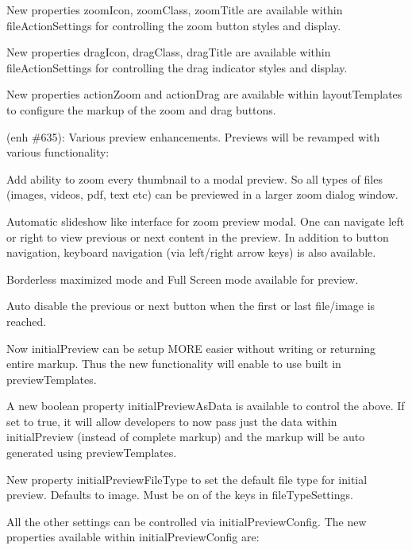 \begin{DoxyItemize}
\begin{DoxyItemize}
\item New properties {\ttfamily zoom\+Icon}, {\ttfamily zoom\+Class}, {\ttfamily zoom\+Title} are available within {\ttfamily file\+Action\+Settings} for controlling the zoom button styles and display.
\item New properties {\ttfamily drag\+Icon}, {\ttfamily drag\+Class}, {\ttfamily drag\+Title} are available within {\ttfamily file\+Action\+Settings} for controlling the drag indicator styles and display.
\item New properties {\ttfamily action\+Zoom} and {\ttfamily action\+Drag} are available within {\ttfamily layout\+Templates} to configure the markup of the zoom and drag buttons.
\end{DoxyItemize}
\item (enh \#635)\+: Various preview enhancements. Previews will be revamped with various functionality\+:
\begin{DoxyItemize}
\item Add ability to zoom every thumbnail to a modal preview. So all types of files (images, videos, pdf, text etc) can be previewed in a larger zoom dialog window.
\item Automatic slideshow like interface for zoom preview modal. One can navigate left or right to view previous or next content in the preview. In addition to button navigation, keyboard navigation (via left/right arrow keys) is also available.
\item Borderless maximized mode and Full Screen mode available for preview.
\item Auto disable the previous or next button when the first or last file/image is reached.
\item Now {\ttfamily initial\+Preview} can be setup M\+O\+RE easier without writing or returning entire markup. Thus the new functionality will enable to use built in {\ttfamily preview\+Templates}.
\item A new boolean property {\ttfamily initial\+Preview\+As\+Data} is available to control the above. If set to {\ttfamily true}, it will allow developers to now pass just the data within {\ttfamily initial\+Preview} (instead of complete markup) and the markup will be auto generated using {\ttfamily preview\+Templates}.
\item New property {\ttfamily initial\+Preview\+File\+Type} to set the default file type for initial preview. Defaults to {\ttfamily image}. Must be on of the keys in {\ttfamily file\+Type\+Settings}.
\item All the other settings can be controlled via {\ttfamily initial\+Preview\+Config}. The new properties available within {\ttfamily initial\+Preview\+Config} are\+:

\end{DoxyItemize}
\end{DoxyItemize}
